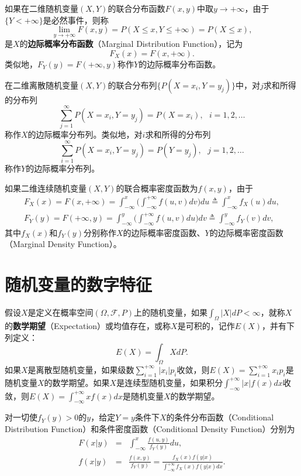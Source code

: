 \begin{definition}[边际概率分布函数]
如果在二维随机变量$(X,Y)$的联合分布函数$F(x,y)$中取$y\rightarrow +\infty$，由于$\{Y<+\infty\}$是必然事件，则称
\[
    \lim\limits_{y\rightarrow +\infty} F(x,y) = P(X\le x, Y\le +\infty) = P(X\le x),
\]
是$X$的\textbf{边际概率分布函数}（Marginal Distribution Function），记为
\[
    F_X(x) = F(x,+\infty).
\]
类似地，$F_Y(y)=F(+\infty,y)$称作$Y$的边际概率分布函数。
\end{definition}

在二维离散随机变量$(X,Y)$的联合分布列$\{P(X=x_i,Y=y_j)\}$中，对$j$求和所得的分布列
\[
    \sum\limits_{j=1}^\infty P(X=x_i,Y=y_j)=P(X=x_i),~~~i=1,2,\ldots
\]
称作$X$的边际概率分布列。类似地，对$i$求和所得的分布列
\[
    \sum\limits_{i=1}^\infty P(X=x_i,Y=y_j)=P(Y=y_j),~~~j=1,2,\ldots
\]
称作$Y$的边际概率分布列。

如果二维连续随机变量$(X,Y)$的联合概率密度函数为$f(x,y)$，由于
\begin{eqnarray}
  \nonumber F_X(x) = F(x,+\infty) =\int_{-\infty}^x \Bigg(\int_{-\infty}^{+\infty} f(u,v)dv\Bigg) du \triangleq \int_{-\infty}^x f_X(u)du,\\
  \nonumber F_Y(y) = F(+\infty,y) =\int_{-\infty}^y \Bigg(\int_{-\infty}^{+\infty} f(u,v)du\Bigg) dv\triangleq \int_{-\infty}^y f_Y(v)dv,
\end{eqnarray}
其中$f_X(x)$和$f_Y(y)$分别称作$X$的边际概率密度函数、$Y$的边际概率密度函数（Marginal Density Function）。

\section{随机变量的数字特征}%
\begin{definition}[数学期望]
假设$X$是定义在概率空间$(\Omega,\mathscr F, P)$上的随机变量，如果$\int_{\Omega} |X| dP <\infty$，就称$X$的\textbf{数学期望}（Expectation）或均值存在，或称$X$是可积的，记作$E(X)$，并有下列定义：
\[
    E(X) = \int_{\Omega} X dP.
\]
如果$X$是离散型随机变量，如果级数$\sum\limits_{i=1}^{+\infty} |x_i| p_i$收敛，则$E(X)=\sum\limits_{i=1}^{+\infty} x_i p_i$是随机变量$X$的数学期望。如果$X$是连续型随机变量，如果积分$\int_{-\infty}^{+\infty} |x| f(x)dx$收敛，则$E(X)=\int_{-\infty}^{+\infty} x f(x)dx$是随机变量$X$的数学期望。
\end{definition}

\begin{definition}[条件分布]
对一切使$f_Y(y)>0$的$y$，给定$Y=y$条件下$X$的条件分布函数（Conditional Distribution Function）和条件密度函数（Conditional Density Function）分别为
\begin{eqnarray}
  F(x|y) &=& \int_{-\infty}^x \frac{f(u,y)}{f_Y(y)} du,\\
  f(x|y) &=& \frac{f(x,y)}{f_Y(y)} = \frac{f_X(x) f(y|x)}{\int_{-\infty}^{+\infty} f_X(x) f(y|x) dx}.
\end{eqnarray}
\end{definition}

